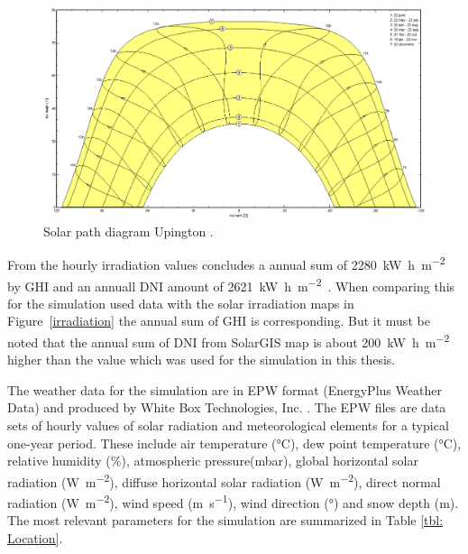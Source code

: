 \begin{figure}[htbp]  
\centering
\includegraphics[width=1\linewidth]{FIG/SunPathUpington}
\caption[Solar path diagram for Upington.]{Solar path diagram Upington \cite{PVsystSA2015}.}\label{SunPathUpington}
\end{figure}
\pagebreak
From the hourly irradiation values concludes a annual sum of \SI{2280}{\kilo\watt\hour\per\square\metre\year} by GHI and an annuall DNI amount of \SI{2621}{\kilo\watt\hour\per\square\metre\year}. When comparing this for the simulation used data with the solar irradiation maps in Figure~\ref{irradiation} the annual sum of GHI is corresponding. But it must be noted that the annual sum of DNI from SolarGIS map \cite{SolarGIS2015b} is about \SI{200}{\kilo\watt\hour\per\square\metre\year} higher than the value which was used for the simulation in this thesis.

The weather data for the simulation are in EPW format (EnergyPlus Weather Data) and produced by White Box Technologies, Inc. \cite{WhiteBoxTechnologies2015}. The EPW files are data sets of hourly values of solar radiation and meteorological elements for a typical one-year period. These include air temperature (\si{\celsius}), dew point temperature (\si{\celsius}), relative humidity (\si{\percent}), atmospheric pressure(\si{\milli\bar}), global horizontal solar radiation (\si{\watt\per\square\metre}), diffuse horizontal solar radiation (\si{\watt\per\square\metre}), direct normal radiation (\si{\watt\per\square\metre}), wind speed (\si{\metre\per\second}), wind direction (\si{\degree}) and snow depth (\si{\metre}). The most relevant parameters for the simulation are summarized in Table \ref{tbl: Location}. 
 
